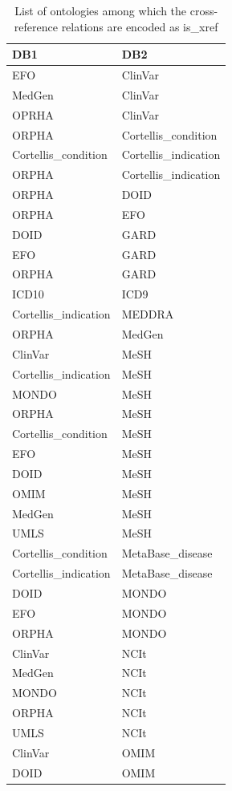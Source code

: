 \documentclass[9pt,a4paper,]{extarticle}
\begin{document}
\begin{table}

\caption{\label{tab:unnamed-chunk-26}List of ontologies among which the cross-reference relations are encoded as is\_xref}
\centering
\begin{tabular}[t]{ll}
\toprule
DB1 & DB2\\
\midrule
EFO & ClinVar\\
MedGen & ClinVar\\
OPRHA & ClinVar\\
ORPHA & Cortellis\_condition\\
Cortellis\_condition & Cortellis\_indication\\
\addlinespace
ORPHA & Cortellis\_indication\\
ORPHA & DOID\\
ORPHA & EFO\\
DOID & GARD\\
EFO & GARD\\
\addlinespace
ORPHA & GARD\\
ICD10 & ICD9\\
Cortellis\_indication & MEDDRA\\
ORPHA & MedGen\\
ClinVar & MeSH\\
\addlinespace
Cortellis\_indication & MeSH\\
MONDO & MeSH\\
ORPHA & MeSH\\
Cortellis\_condition & MeSH\\
EFO & MeSH\\
\addlinespace
DOID & MeSH\\
OMIM & MeSH\\
MedGen & MeSH\\
UMLS & MeSH\\
Cortellis\_condition & MetaBase\_disease\\
\addlinespace
Cortellis\_indication & MetaBase\_disease\\
DOID & MONDO\\
EFO & MONDO\\
ORPHA & MONDO\\
ClinVar & NCIt\\
\addlinespace
MedGen & NCIt\\
MONDO & NCIt\\
ORPHA & NCIt\\
UMLS & NCIt\\
ClinVar & OMIM\\
\addlinespace
DOID & OMIM\\

\end{tabular}
\end{table}
\end{document}
